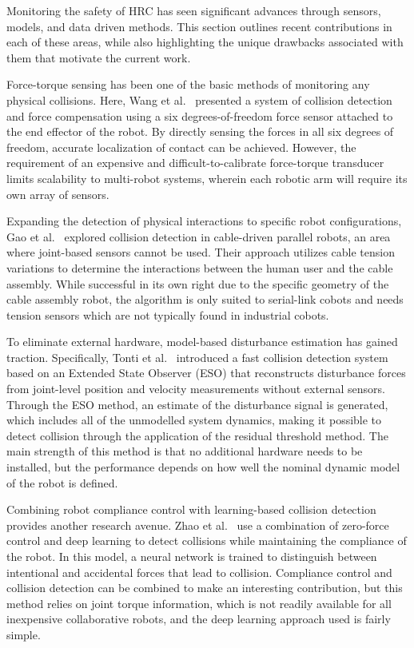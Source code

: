 \documentclass[3p,times,procedia]{elsarticle}
\begin{document}
Monitoring the safety of HRC has seen significant advances through sensors, models, and data driven methods. This section outlines recent contributions in each of these areas, while also highlighting the unique drawbacks associated with them that motivate the current work.

Force-torque sensing has been one of the basic methods of monitoring any physical collisions. Here, Wang et al.~\cite{wang2025sixdof} presented a system of collision detection and force compensation using a six degrees-of-freedom force sensor attached to the end effector of the robot. By directly sensing the forces in all six degrees of freedom, accurate localization of contact can be achieved. However, the requirement of an expensive and difficult-to-calibrate force-torque transducer limits scalability to multi-robot systems, wherein each robotic arm will require its own array of sensors.

Expanding the detection of physical interactions to specific robot configurations, Gao et al.~\cite{gao2024cable} explored collision detection in cable-driven parallel robots, an area where joint-based sensors cannot be used. Their approach utilizes cable tension variations to determine the interactions between the human user and the cable assembly. While successful in its own right due to the specific geometry of the cable assembly robot, the algorithm is only suited to serial-link cobots and needs tension sensors which are not typically found in industrial cobots.

To eliminate external hardware, model-based disturbance estimation has gained traction. Specifically, Tonti et al.~\cite{tonti2024eso} introduced a fast collision detection system based on an Extended State Observer (ESO) that reconstructs disturbance forces from joint-level position and velocity measurements without external sensors. Through the ESO method, an estimate of the disturbance signal is generated, which includes all of the unmodelled system dynamics, making it possible to detect collision through the application of the residual threshold method. The main strength of this method is that no additional hardware needs to be installed, but the performance depends on how well the nominal dynamic model of the robot is defined.

Combining robot compliance control with learning-based collision detection provides another research avenue. Zhao et al.~\cite{zhao2025zeroforce} use a combination of zero-force control and deep learning to detect collisions while maintaining the compliance of the robot. In this model, a neural network is trained to distinguish between intentional and accidental forces that lead to collision. Compliance control and collision detection can be combined to make an interesting contribution, but this method relies on joint torque information, which is not readily available for all inexpensive collaborative robots, and the deep learning approach used is fairly simple.
\end{document}
